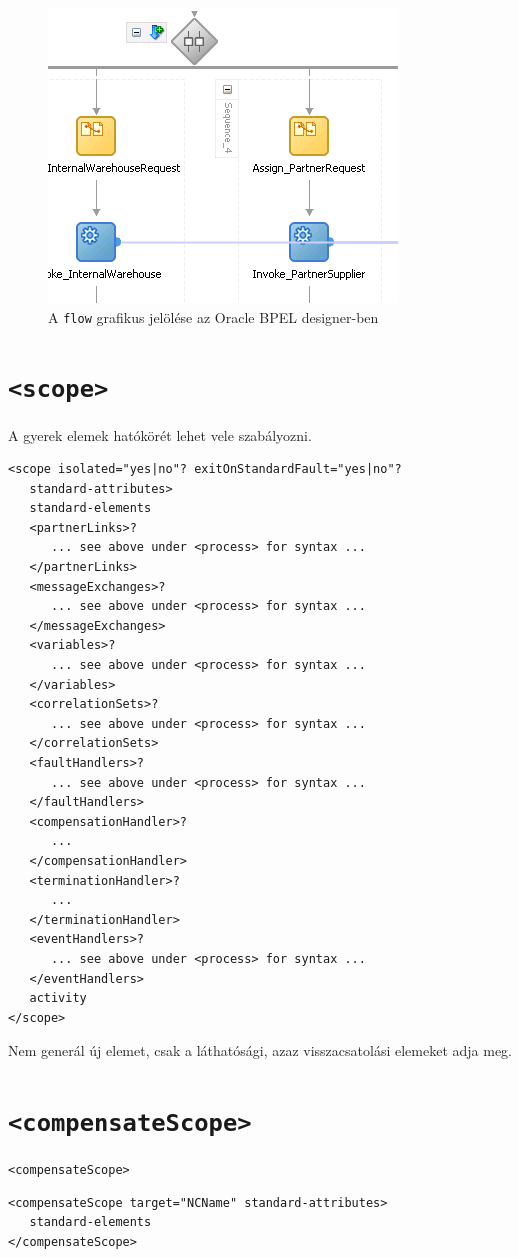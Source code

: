 \begin{figure}[h!]
\centering
\includegraphics[scale=1]{images/flow.png}
\caption{A \texttt{flow} grafikus jelölése az Oracle BPEL designer-ben}
\label{fig:flow}
\end{figure}

\section{\texttt{<scope>}}

A gyerek elemek hatókörét lehet vele szabályozni.
\begin{verbatim}
<scope isolated="yes|no"? exitOnStandardFault="yes|no"?
   standard-attributes>
   standard-elements
   <partnerLinks>?
      ... see above under <process> for syntax ...
   </partnerLinks>
   <messageExchanges>?
      ... see above under <process> for syntax ...
   </messageExchanges>
   <variables>?
      ... see above under <process> for syntax ...
   </variables>
   <correlationSets>?
      ... see above under <process> for syntax ...
   </correlationSets>
   <faultHandlers>?
      ... see above under <process> for syntax ...
   </faultHandlers>
   <compensationHandler>?
      ...
   </compensationHandler>
   <terminationHandler>?
      ...
   </terminationHandler>
   <eventHandlers>?
      ... see above under <process> for syntax ...
   </eventHandlers>
   activity
</scope>
\end{verbatim}
Nem generál új elemet, csak a láthatósági, azaz visszacsatolási elemeket adja meg. 

\section{\texttt{<compensateScope>}}

\texttt{<compensateScope>}
\begin{verbatim}
<compensateScope target="NCName" standard-attributes>
   standard-elements
</compensateScope>
\end{verbatim}

